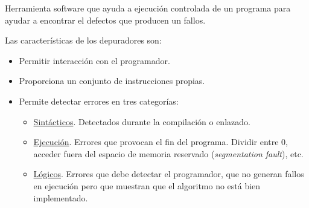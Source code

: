 \begin{definicion}[Depurador]
    Herramienta software que ayuda a ejecución controlada de un programa para ayudar a encontrar el defectos que producen un fallos.
\end{definicion}

Las características de los depuradores son:
   \begin{itemize}
       \item Permitir interacción con el programador.
       \item Proporciona un conjunto de instrucciones propias.
       \item Permite detectar errores en tres categorías:
       \begin{itemize}
           \item \underline{Sintácticos}. Detectados durante la compilación o enlazado.
           \item \underline{Ejecución}. Errores que provocan el fin del programa. Dividir entre 0, acceder fuera del espacio de memoria reservado (\textit{segmentation fault}), etc.

           \item \underline{Lógicos}. Errores que debe detectar el programador, que no generan fallos en ejecución pero que muestran que el algoritmo no está bien implementado.
       \end{itemize}
   \end{itemize}